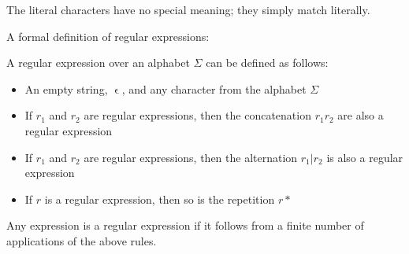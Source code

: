 The literal characters have no special meaning; they simply match literally.



A formal definition of regular expressions:
\begin{definition}
  \label{def:regexp}
  A regular expression over an alphabet $\Sigma$ can be defined as follows:
\begin{itemize}
\item An empty string, $\upvarepsilon$, and any character from the
  alphabet $\Sigma$
\item If $r_1$ and $r_2$ are regular expressions, then the
  concatenation $r_1r_2$ are also a regular expression
\item If $r_1$ and $r_2$ are regular expressions, then the alternation
  $r_1|r_2$ is also a regular expression
\item If $r$ is a regular expression, then so is the repetition $r*$
\end{itemize}

Any expression is a regular expression if it follows from a finite
number of applications of the above rules.
\end{definition}

